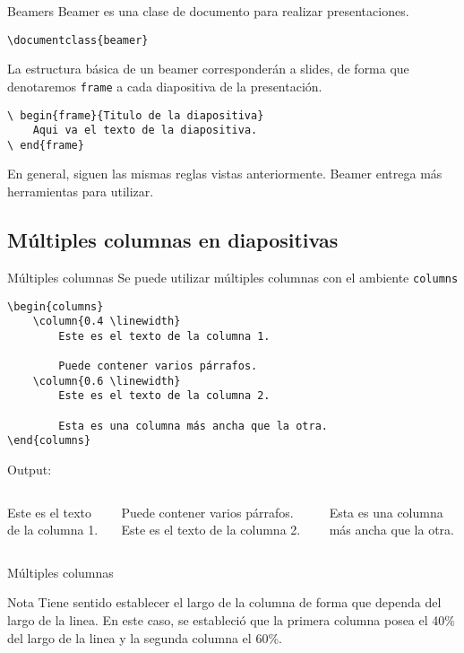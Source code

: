 \documentclass[../slides.tex]{subfiles}
\begin{document}
    \begin{frame}
        \tableofcontents[sections=\value{section}]
    \end{frame}
        
    \begin{frame}[fragile]{Beamers}
        Beamer es una clase de documento para realizar presentaciones.

            \begin{verbatim}
\documentclass{beamer}
            \end{verbatim}

        La estructura básica de un beamer corresponderán a slides, de forma que denotaremos \texttt{frame} a cada diapositiva de la presentación.
        
        \begin{verbatim}
\ begin{frame}{Titulo de la diapositiva}
    Aqui va el texto de la diapositiva.
\ end{frame}
        \end{verbatim}

        En general, siguen las mismas reglas vistas anteriormente. Beamer entrega más herramientas para utilizar.
    \end{frame}

    \subsection{Múltiples columnas en diapositivas}

    \begin{frame}[fragile]{Múltiples columnas}
        Se puede utilizar múltiples columnas con el ambiente \texttt{columns}
        \begin{verbatim}
\begin{columns}
    \column{0.4 \linewidth}
        Este es el texto de la columna 1.
            
        Puede contener varios párrafos.
    \column{0.6 \linewidth}
        Este es el texto de la columna 2.
            
        Esta es una columna más ancha que la otra.
\end{columns}
        \end{verbatim}
    Output:
    
        \begin{columns}
                Este es el texto de la columna 1.

                Puede contener varios párrafos.
                Este es el texto de la columna 2.

                Esta es una columna más ancha que la otra.
        \end{columns}
     \end{frame}

     \begin{frame}{Múltiples columnas}
        \begin{block}{Nota}
            Tiene sentido establecer el largo de la columna de forma que dependa del largo de la linea. En este caso, se estableció que la primera columna posea el 40\% del largo de la linea y la segunda columna el 60\%.
        \end{block}
     \end{frame}
\end{document}
